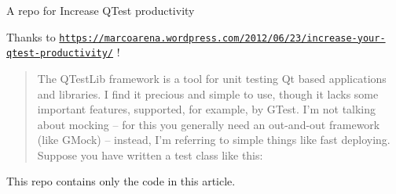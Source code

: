 A repo for Increase Q\+Test productivity

Thanks to \href{https://marcoarena.wordpress.com/2012/06/23/increase-your-qtest-productivity/}{\tt https\+://marcoarena.\+wordpress.\+com/2012/06/23/increase-\/your-\/qtest-\/productivity/} ! \begin{quote}
The Q\+Test\+Lib framework is a tool for unit testing Qt based applications and libraries. I find it precious and simple to use, though it lacks some important features, supported, for example, by G\+Test. I’m not talking about mocking – for this you generally need an out-\/and-\/out framework (like G\+Mock) – instead, I’m referring to simple things like fast deploying. Suppose you have written a test class like this\+: \end{quote}


This repo contains only the code in this article. 